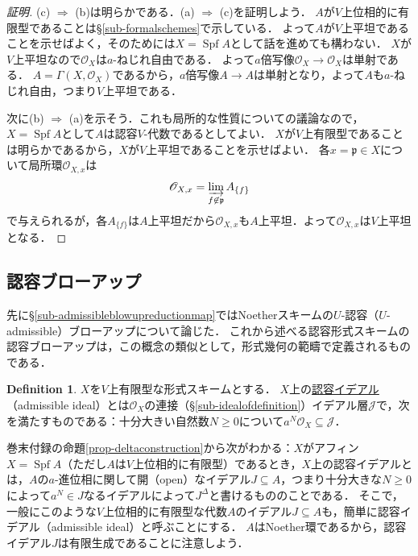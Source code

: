 \documentclass[a4paper,12pt, dvipdfmx]{jsbook}
\def\O{\mathscr{O}}
\def\Spf{\mathop{\mathrm{Spf}}\nolimits}
\theoremstyle{plain}
\theoremstyle{definition}
\newtheorem{dfn}[thm]{\bfseries Definition}
\begin{document}
\begin{proof}[証明]
(c) $\Rightarrow$ (b)は明らかである．(a) $\Rightarrow$ (c)を証明しよう．
$A$が$V$上位相的に有限型であることは\S\ref{sub-formalschemes}で示している．
よって$A$が$V$上平坦であることを示せばよく，そのためには$X=\Spf A$として話を進めても構わない．
$X$が$V$上平坦なので$\O_X$は$a$-ねじれ自由である．
よって$a$倍写像$\O_X\rightarrow\O_X$は単射である．
$A=\Gamma(X,\O_X)$であるから，$a$倍写像$A\rightarrow A$は単射となり，よって$A$も$a$-ねじれ自由，つまり$V$上平坦である．

次に(b) $\Rightarrow$ (a)を示そう．これも局所的な性質についての議論なので，$X=\Spf A$として$A$は認容$V$-代数であるとしてよい．
$X$が$V$上有限型であることは明らかであるから，$X$が$V$上平坦であることを示せばよい．
各$x=\mathfrak{p}\in X$について局所環$\O_{X,x}$は
$$
\O_{X,x}=\varinjlim_{f\not\in\mathfrak{p}}A_{\{f\}}
$$
で与えられるが，各$A_{\{f\}}$は$A$上平坦だから$\O_{X,x}$も$A$上平坦．よって$\O_{X,x}$は$V$上平坦となる．
\end{proof}

\subsection{認容ブローアップ}\label{sub-admissibleformalblowups}
先に\S\ref{sub-admissibleblowupreductionmap}ではNoetherスキームの$U$-認容（$U$-admissible）ブローアップについて論じた．
これから述べる認容形式スキームの認容ブローアップは，この概念の類似として，形式幾何の範疇で定義されるものである．

\begin{dfn}\label{dfn-admissibleidealsformal}{\rm 
$X$を$V$上有限型な形式スキームとする．
$X$上の\underline{認容イデアル}（admissible ideal）とは$\O_X$の連接（\S\ref{sub-idealofdefinition}）イデアル層$\mathscr{J}$で，次を満たすものである：十分大きい自然数$N\geq 0$について$a^N\O_X\subseteq\mathscr{J}$．}
\end{dfn}

巻末付録の命題\ref{prop-deltaconstruction}から次がわかる：$X$がアフィン$X=\Spf A$（ただし$A$は$V$上位相的に有限型）であるとき，$X$上の認容イデアルとは，$A$の$a$-進位相に関して開（open）なイデアル$J\subseteq A$，つまり十分大きな$N\geq 0$によって$a^N\in J$なるイデアルによって$J^{\Delta}$と書けるもののことである．
そこで，一般にこのような$V$上位相的に有限型な代数$A$のイデアル$J\subseteq A$も，簡単に認容イデアル（admissible ideal）と呼ぶことにする．
$A$はNoether環であるから，認容イデアル$J$は有限生成であることに注意しよう．
\end{document}

